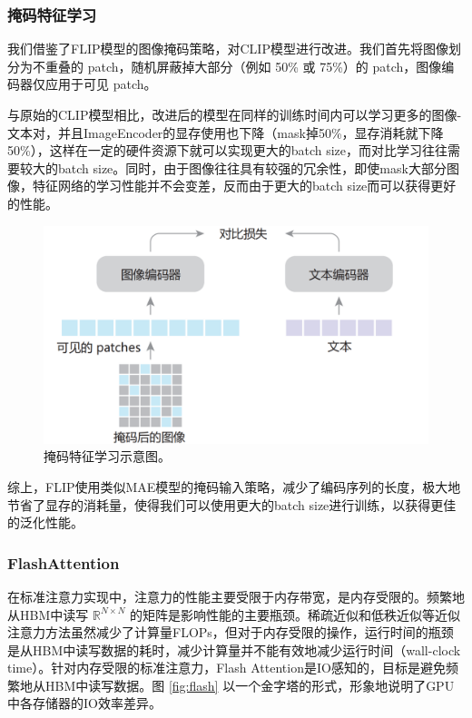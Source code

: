 \documentclass[a4paper]{zreport}
\begin{document}
\subsubsection{掩码特征学习}

我们借鉴了FLIP模型的图像掩码策略，对CLIP模型进行改进。我们首先将图像划分为不重叠的 patch，随机屏蔽掉大部分（例如 50\% 或 75\%）的 patch，图像编码器仅应用于可见 patch。

与原始的CLIP模型相比，改进后的模型在同样的训练时间内可以学习更多的图像-文本对，并且ImageEncoder的显存使用也下降（mask掉50\%，显存消耗就下降50\%），这样在一定的硬件资源下就可以实现更大的batch size，而对比学习往往需要较大的batch size。同时，由于图像往往具有较强的冗余性，即使mask大部分图像，特征网络的学习性能并不会变差，反而由于更大的batch size而可以获得更好的性能。

\begin{figure}[h]
\centering
\includegraphics[width=0.95\linewidth]{figures/mask}
\caption{掩码特征学习示意图。}
\label{fig:mask}
\end{figure}

综上，FLIP使用类似MAE模型的掩码输入策略，减少了编码序列的长度，极大地节省了显存的消耗量，使得我们可以使用更大的batch size进行训练，以获得更佳的泛化性能。


\subsubsection{FlashAttention}

在标准注意力实现中，注意力的性能主要受限于内存带宽，是内存受限的。频繁地从HBM中读写 $\mathbb{R}^{N \times N}$ 的矩阵是影响性能的主要瓶颈。稀疏近似和低秩近似等近似注意力方法虽然减少了计算量FLOPs，但对于内存受限的操作，运行时间的瓶颈是从HBM中读写数据的耗时，减少计算量并不能有效地减少运行时间（wall-clock time）。针对内存受限的标准注意力，Flash Attention是IO感知的，目标是避免频繁地从HBM中读写数据。图 \ref{fig:flash} 以一个金字塔的形式，形象地说明了GPU中各存储器的IO效率差异。
\end{document}
